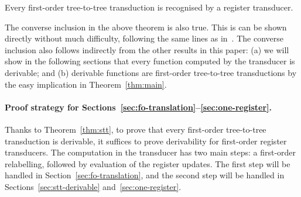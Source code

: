 \begin{theorem}\label{thm:stt}
    Every first-order tree-to-tree transduction is recognised by a  register transducer. 
\end{theorem}

The converse  inclusion in the above theorem is also true. This is can be shown directly without much difficulty, following the same lines as in~\cite[Section 5]{bloem_comparison_2000}.  The converse inclusion also follows indirectly  from the other results in this paper: (a) we will show in the following sections that every function computed by the transducer is derivable; and (b)  derivable functions are first-order tree-to-tree transductions by the easy implication in Theorem~\ref{thm:main}.

\paragraph*{Proof strategy for Sections~\ref{sec:fo-translation}--\ref{sec:one-register}.} Thanks to Theorem~\ref{thm:stt}, to prove that every first-order tree-to-tree transduction is derivable, it suffices to prove derivability for first-order register transducers. The computation in the transducer has two main steps: a first-order relabelling, followed by evaluation of the register updates. The first step will be handled in Section~\ref{sec:fo-translation}, and the second step will be handled in Sections~\ref{sec:stt-derivable} and~\ref{sec:one-register}.






